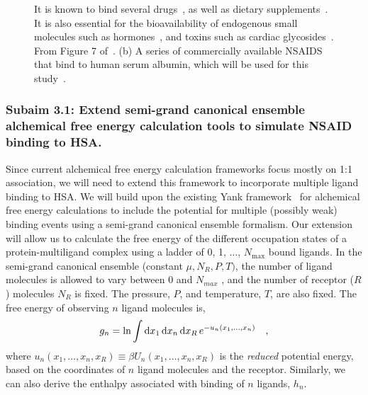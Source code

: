 \documentclass[10pt,final]{article}
\begin{document}
\begin{figure}[H]
{It is known to bind several drugs~\autocite{SJOeHOLM1979a,Bannwarth1996a,Sulkowska2002a,Ghuman2005a,Perez2007a,Zsila2011a}, as well as dietary supplements~\autocite{Pal2013a}. It is also essential for the bioavailability of endogenous small molecules such as hormones~\autocite{Pardridge1986a}, and toxins such as cardiac glycosides~\autocite{Smith1985a}. From Figure 7 of~\autocite{Ghuman2005a}. (b) A series of commercially available NSAIDS that bind to human serum albumin, which will be used for this study~\autocite{Zsila2011a}.}
\label{figure:hsa}
\end{figure} 

\subsubsection*{Subaim 3.1: Extend semi-grand canonical ensemble alchemical free energy calculation tools to simulate NSAID binding to HSA.}
Since current alchemical free energy calculation frameworks focus mostly on 1:1 association, we will need to extend this framework to incorporate multiple ligand binding to HSA. 
%
We will build upon the existing Yank framework~\autocite{Chodera2015a} for alchemical free energy calculations to include the potential for multiple (possibly weak) binding events using a semi-grand canonical ensemble formalism. 
%
Our extension will allow us to calculate the free energy of the different occupation states of a protein-multiligand complex using a ladder of 0, 1, $\dots$, $N_\mathrm{max}$ bound ligands.
%
In the semi-grand canonical ensemble (constant $\mu, N_R, P,T)$, the number of ligand molecules is allowed to vary between 0 and $N_{max}$ , and the number of receptor ($R$) molecules $N_R$ is fixed.
%
The pressure, $P$, and temperature, $T$, are also fixed. The free energy of observing $n$ ligand molecules is,
\begin{align}
 g_n = \ln \int \dif x_1 \dif x_n \dif x_R \, e^{-u_n(x_1,\dots,x_n)} \quad,
\end{align}
%
where  $u_n(x_1,\ldots,x_n,x_R) \equiv \beta U_n(x_1,\ldots,x_n,x_R)$ is the \textit{reduced} potential energy, based on the coordinates of $n$ ligand molecules and the receptor. Similarly, we can also derive the enthalpy associated with binding of $n$ ligands, $h_n$.
\end{document}

